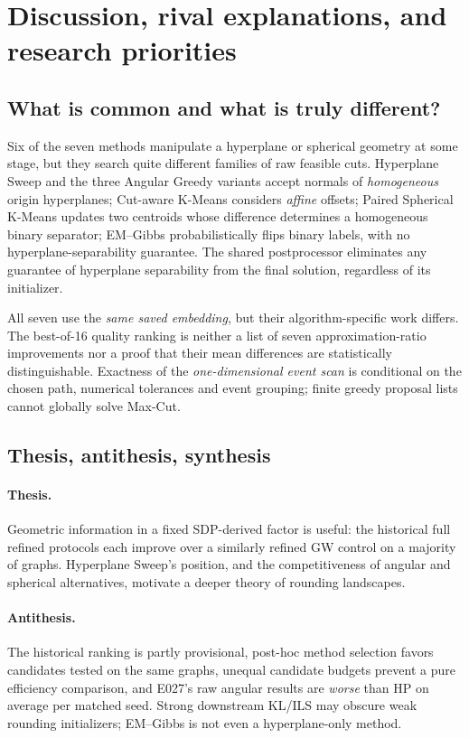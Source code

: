 \section{Discussion, rival explanations, and research priorities}\label{sec:discussion}
\subsection{What is common and what is truly different?}
Six of the seven methods manipulate a hyperplane or spherical geometry at some stage, but they search quite different families of raw feasible cuts. Hyperplane Sweep and the three Angular Greedy variants accept normals of \emph{homogeneous} origin hyperplanes; Cut-aware K-Means considers \emph{affine} offsets; Paired Spherical K-Means updates two centroids whose difference determines a homogeneous binary separator; EM--Gibbs probabilistically flips binary labels, with no hyperplane-separability guarantee. The shared postprocessor eliminates any guarantee of hyperplane separability from the final solution, regardless of its initializer.

All seven use the \emph{same saved embedding}, but their algorithm-specific work differs. The best-of-16 quality ranking is neither a list of seven approximation-ratio improvements nor a proof that their mean differences are statistically distinguishable. Exactness of the \emph{one-dimensional event scan} is conditional on the chosen path, numerical tolerances and event grouping; finite greedy proposal lists cannot globally solve Max-Cut.

\subsection{Thesis, antithesis, synthesis}
\paragraph{Thesis.} Geometric information in a fixed SDP-derived factor is useful: the historical full refined protocols each improve over a similarly refined GW control on a majority of graphs. Hyperplane Sweep's position, and the competitiveness of angular and spherical alternatives, motivate a deeper theory of rounding landscapes.

\paragraph{Antithesis.} The historical ranking is partly provisional, post-hoc method selection favors candidates tested on the same graphs, unequal candidate budgets prevent a pure efficiency comparison, and E027's raw angular results are \emph{worse} than HP on average per matched seed. Strong downstream KL/ILS may obscure weak rounding initializers; EM--Gibbs is not even a hyperplane-only method.

